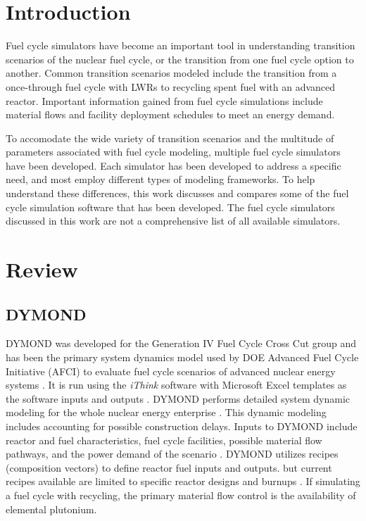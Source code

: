 \documentclass{article}
\begin{document}
\section{Introduction}
    Fuel cycle simulators have become an important tool in understanding 
    transition scenarios of the nuclear fuel cycle, or the transition 
    from one fuel cycle option to another. Common transition scenarios 
    modeled include the transition from a once-through fuel cycle with 
    \glspl{LWR} to recycling spent fuel with an advanced reactor. Important 
    information gained from fuel cycle simulations include material 
    flows and facility deployment schedules to meet an energy demand. 

    To accomodate the wide variety of transition scenarios and the multitude
    of parameters associated with fuel cycle modeling, multiple fuel 
    cycle simulators have been developed. Each simulator has been developed 
    to address a specific need, and most employ different types of modeling 
    frameworks. To help understand these differences, this work discusses 
    and compares some of the fuel cycle simulation 
    software that has been developed. The fuel cycle simulators 
    discussed in this work are not a comprehensive list of all available 
    simulators. 
    

\section{Review}
\subsection{DYMOND}
    \gls{DYMOND} was developed for the Generation IV Fuel Cycle Cross Cut 
    group and has been the primary 
    system dynamics model used by \gls{DOE} Advanced Fuel Cycle Initiative (AFCI)
    to evaluate fuel cycle scenarios of 
    advanced nuclear energy systems \cite{yacout_visionverifiable_2006}.
    It is run using the \textit{iThink} software with Microsoft Excel 
    templates as the software inputs and outputs \cite{feng_standardized_2016}.
    \gls{DYMOND} performs detailed system dynamic modeling for the whole nuclear 
    energy enterprise \cite{yacout_visionverifiable_2006}. This dynamic modeling includes 
    accounting for possible construction delays. 
    Inputs to DYMOND include reactor and fuel characteristics, fuel cycle
    facilities, possible material flow pathways, and the power demand of the 
    scenario \cite{feng_standardized_2016}. 
    \gls{DYMOND} utilizes recipes (composition vectors) to define reactor fuel 
    inputs and outputs. but current recipes available are limited 
    to specific reactor designs and burnups \cite{yacout_visionverifiable_2006}.
    If simulating a fuel cycle with recycling, the primary material flow control 
    is the availability of elemental plutonium.
\end{document}
